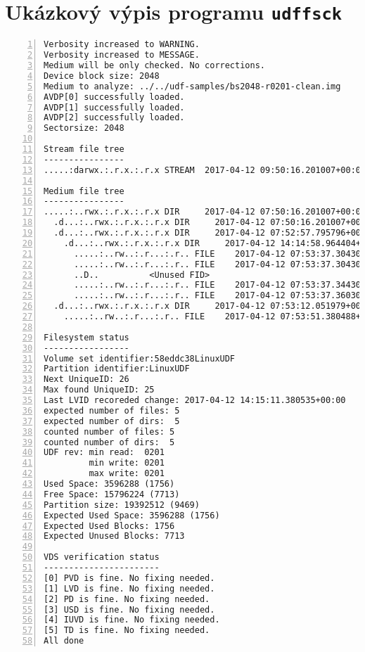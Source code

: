 \chapter{Ukázkový výpis programu \texttt{udffsck}}
\begin{lstlisting}[frame=single,caption={Ukázka výstupu programu pro médium s velikostí sektoru 2048~B a vstupními parametry \texttt{-vvp -B 2048}},label=lst:bs512,basicstyle=\ttfamily\scriptsize, keywordstyle=\color{black}\bfseries\underbar,nolol,numbers=left,extendedchars=true]
Verbosity increased to WARNING.
Verbosity increased to MESSAGE.
Medium will be only checked. No corrections.
Device block size: 2048
Medium to analyze: ../../udf-samples/bs2048-r0201-clean.img
AVDP[0] successfully loaded.
AVDP[1] successfully loaded.
AVDP[2] successfully loaded.
Sectorsize: 2048

Stream file tree
----------------
.....:darwx.:.r.x.:.r.x STREAM  2017-04-12 09:50:16.201007+00:00        40  <ROOT>

Medium file tree
----------------
.....:..rwx.:.r.x.:.r.x DIR     2017-04-12 07:50:16.201007+00:00       188  <ROOT>
  .d...:..rwx.:.r.x.:.r.x DIR     2017-04-12 07:50:16.201007+00:00        40  "lost+found"
  .d...:..rwx.:.r.x.:.r.x DIR     2017-04-12 07:52:57.795796+00:00        96  "data"
    .d...:..rwx.:.r.x.:.r.x DIR     2017-04-12 14:14:58.964404+00:00       416  "life is strange"
      .....:..rw..:.r...:.r.. FILE    2017-04-12 07:53:37.304305+00:00    572192  "life is strange by katewindhelm.jpg"
      .....:..rw..:.r...:.r.. FILE    2017-04-12 07:53:37.304305+00:00    352154  "642030.jpg"
      ..D..          <Unused FID>                                           "life is strange.jpg"
      .....:..rw..:.r...:.r.. FILE    2017-04-12 07:53:37.344305+00:00   1588217  "Life is strange.jpg"
      .....:..rw..:.r...:.r.. FILE    2017-04-12 07:53:37.360306+00:00    899265  "Chloe background.jpg"
  .d...:..rwx.:.r.x.:.r.x DIR     2017-04-12 07:53:12.051979+00:00        96  "nejaka data"
    .....:..rw..:.r...:.r.. FILE    2017-04-12 07:53:51.380488+00:00    153600  "acminecraft.tar"

Filesystem status
-----------------
Volume set identifier:58eddc38LinuxUDF
Partition identifier:LinuxUDF
Next UniqueID: 26
Max found UniqueID: 25
Last LVID recoreded change: 2017-04-12 14:15:11.380535+00:00
expected number of files: 5
expected number of dirs:  5
counted number of files: 5
counted number of dirs:  5
UDF rev: min read:  0201
         min write: 0201
         max write: 0201
Used Space: 3596288 (1756)
Free Space: 15796224 (7713)
Partition size: 19392512 (9469)
Expected Used Space: 3596288 (1756)
Expected Used Blocks: 1756
Expected Unused Blocks: 7713

VDS verification status
-----------------------
[0] PVD is fine. No fixing needed.
[1] LVD is fine. No fixing needed.
[2] PD is fine. No fixing needed.
[3] USD is fine. No fixing needed.
[4] IUVD is fine. No fixing needed.
[5] TD is fine. No fixing needed.
All done
\end{lstlisting}
